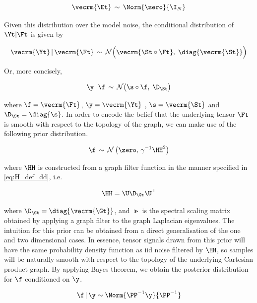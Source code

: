 \begin{equation}
    \vecrm{\Et} \, \sim \, \Norm{\zero}{\I_N}
\end{equation}

Given this distribution over the model noise, the conditional distribution of $\Yt |  \Ft$ is given by 

\begin{equation}
    \vecrm{\Yt} \, | \, \vecrm{\Ft} \, \sim \, \mathcal{N}\Big(\vecrm{\St \circ \Ft}, \; \diag{\vecrm{\St}}\Big)
\end{equation}

Or, more concisely, 

\begin{equation}
    \y \, | \, \f \, \sim \, \mathcal{N}\big(\s \circ \f, \; \D_{\St} \big)
\end{equation}

where $\f = \vecrm{\Ft}$, $\y = \vecrm{\Yt}$ , $\s = \vecrm{\St}$ and $\D_{\St} = \diag{\s}$. In order to encode the belief that the underlying tensor $\Ft$ is smooth with respect to the topology of the graph, we can make use of the following prior distribution. 

\begin{equation}
    \f \, \sim \, \mathcal{N}\left( \zero, \, \gamma^{-1} \HH^2 \right) 
\end{equation}

where $\HH$ is constructed from a graph filter function in the manner specified in \cref{eq:H_def_dd}, i.e.

\begin{equation*}
    \HH = \U \D_\Gt \U^\top
\end{equation*}

where $\D_\Gt = \diag{\vecrm{\Gt}}$, and $\Gt$ is the spectral scaling matrix obtained by applying a graph filter to the graph Laplacian eigenvalues. The intuition for this prior can be obtained from a direct generalisation of the one and two dimensional cases. In essence, tensor signals drawn from this prior will have the same probability density function as iid noise filtered by $\HH$, so samples will be naturally smooth with respect to the topology of the underlying Cartesian product graph. By applying Bayes theorem, we obtain the posterior distribution for $\f$ conditioned on $\y$. 


\begin{equation}
    \f \, | \, \y \sim \Norm{\PP^{-1} \y}{\PP^{-1}}
\end{equation}

